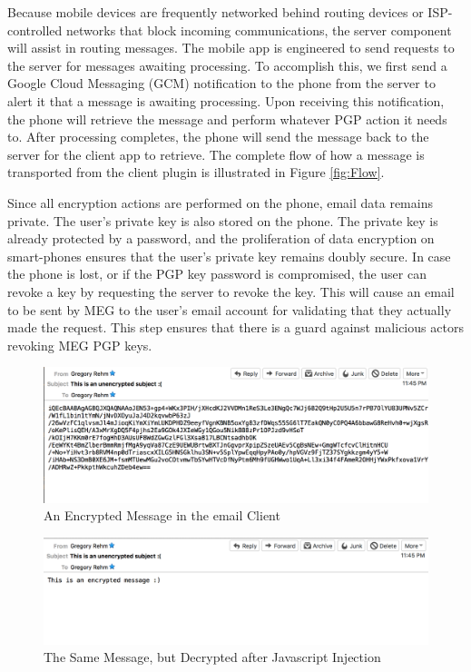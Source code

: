 \documentclass[10pt]{article}
\begin{document}
\begin{multicols}{2}
\par Because mobile devices are frequently networked behind routing devices or ISP-controlled networks that block incoming communications, the server component will assist in routing messages. The mobile app is engineered to send requests to the server for messages awaiting processing. To accomplish this, we first send a Google Cloud Messaging (GCM) notification to the phone from the server to alert it that a message is awaiting processing. Upon receiving this notification, the phone will retrieve the message and perform whatever PGP action it needs to. After processing completes, the phone will send the message back to the server for the client app to retrieve. The complete flow of how a message is transported from the client plugin is illustrated in Figure \ref{fig:Flow}.
\par Since all encryption actions are performed on the phone, email data remains private. The user's private key is also stored on the phone. The private key is already protected by a password, and the proliferation of data encryption on smart-phones ensures that the user's private key remains doubly secure. In case the phone is lost, or if the PGP key password is compromised, the user can revoke a key by requesting the server to revoke the key. This will cause an email to be sent by MEG to the user's email account for validating that they actually made the request. This step ensures that there is a guard against malicious actors revoking MEG PGP keys.
\end{multicols}
\begin{figure}[h]
    \centering
    \includegraphics[scale=.5]{encrypted-msg.png}
    \caption{An Encrypted Message in the email Client}
    \label{fig:Encrypted-client}
\end{figure}
\begin{figure}[h]
    \centering
    \includegraphics[scale=.5]{decrypted-msg.png}
    \caption{The Same Message, but Decrypted after Javascript Injection}
    \label{fig:Decrypted-client}
\end{figure}
\end{document}
